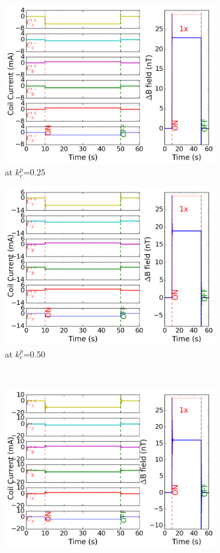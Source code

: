 \begin{figure}[!htb]
    \begin{subfigure}{.5\linewidth}
        \centering
        \includegraphics[width=\linewidth, height= 6.5 cm]{Images/p25}
        \caption{at $k_c^p$=0.25}
        \label{fig:p25m}
    \end{subfigure}%
    \begin{subfigure}{.5\linewidth}
        \centering
        \includegraphics[width=\linewidth, height= 6.5 cm]{Images/p50}
        \caption{at $k_c^p$=0.50}
        \label{fig:p50m}
    \end{subfigure}\\[1ex]
    \begin{subfigure}{.5\linewidth}
        \centering
        \includegraphics[width=\linewidth, height= 6.5 cm]{Images/p75}

\end{subfigure}
\end{figure}

